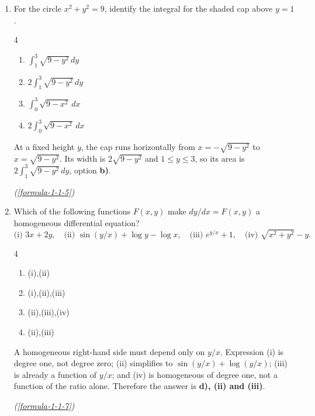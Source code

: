 \begin{enumerate}[label={},leftmargin=1.15cm,labelwidth=1.0cm,labelsep=0.15cm,itemindent=0pt,listparindent=0pt,itemsep=\baselineskip,parsep=0pt,topsep=0pt]
\item[3.1.12] For the circle $x^2+y^2=9$, identify the integral for the shaded cap above $y=1$.

\begin{multicols}{4}
\begin{enumerate}
\setlength{\itemsep}{0pt}
    \item $\int_1^3\sqrt{9-y^2}\,dy$
    \item $2\int_1^3\sqrt{9-y^2}\,dy$
    \item $\int_0^3\sqrt{9-x^2}\,dx$
    \item $2\int_0^3\sqrt{9-x^2}\,dx$
\end{enumerate}
\end{multicols}

\vspace{0.6em}\par\solution


At a fixed height $y$, the cap runs horizontally from $x=-\sqrt{9-y^2}$ to $x=\sqrt{9-y^2}$. Its width is $2\sqrt{9-y^2}$ and $1\le y\le3$, so its area is $\boxed{2\int_1^3\sqrt{9-y^2}\,dy}$, option \textbf{b)}.\par\noindent\hfill\mbox{\textit{(\ref{formula-1-1-5})}}\par

\item[3.1.13] Which of the following functions $F(x,y)$ make $dy/dx=F(x,y)$ a homogeneous differential equation?
\[
\text{(i) }3x+2y,\quad \text{(ii) }\sin(y/x)+\log y-\log x,\quad
\text{(iii) }e^{y/x}+1,\quad \text{(iv) }\sqrt{x^2+y^2}-y.
\]
\begin{multicols}{4}
\begin{enumerate}
\setlength{\itemsep}{0pt}
    \item (i),(ii)
    \item (i),(ii),(iii)
    \item (ii),(iii),(iv)
    \item (ii),(iii)
\end{enumerate}
\end{multicols}

\vspace{0.6em}\par\solution


A homogeneous right-hand side must depend only on $y/x$. Expression (i) is degree one, not degree zero; (ii) simplifies to $\sin(y/x)+\log(y/x)$; (iii) is already a function of $y/x$; and (iv) is homogeneous of degree one, not a function of the ratio alone. Therefore the answer is \textbf{d), (ii) and (iii)}.\par\noindent\hfill\mbox{\textit{(\ref{formula-1-1-7})}}\par


\end{enumerate}
